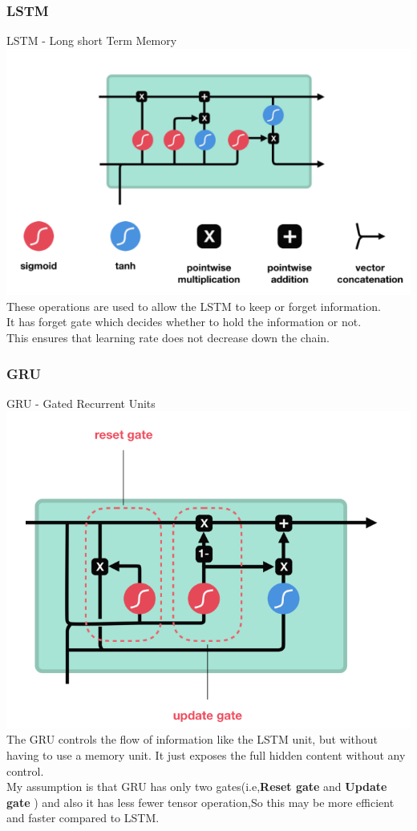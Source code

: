 \documentclass{beamer}
\theoremstyle{remark}
\numberwithin{equation}{section}
\begin{document}
\subsubsection{LSTM}
\begin{frame}{LSTM - Long short Term Memory}
\includegraphics[width=0.8\columnwidth]{./figs/LSTM.png}\\
These operations are used to allow the LSTM to keep or forget information.\\
It has forget gate which decides whether to hold the information or not.\\
This ensures that learning rate does not decrease down the chain.
\end{frame}
\subsubsection{GRU}
\begin{frame}{GRU - Gated Recurrent Units}
\includegraphics[width=0.5\columnwidth]{./figs/GRU.png}\\
The GRU controls the flow of information like the LSTM unit, but without having to use a memory unit. It just exposes the full hidden content without any control.\\
My assumption is that GRU has only two gates(i.e,\textbf{Reset gate} and \textbf{Update gate} ) and also it has less fewer tensor operation,So this may be more efficient and faster compared to LSTM.
\end{frame}
\end{document}
